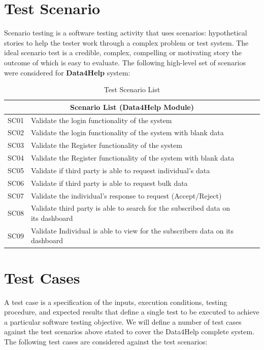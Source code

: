 \documentclass[a4paper, hidelinks, 12pt]{report}
\begin{document}
	\section{Test Scenario}
Scenario testing is a software testing activity that uses scenarios: hypothetical stories to help the tester work through a complex problem or test system. The ideal scenario test is a credible, complex, compelling or motivating story the outcome of which is easy to evaluate. The following high-level set of scenarios were considered for \textbf{Data4Help} system:
\begin{table}[htbp]
  \centering
  \caption{Test Scenario List}
    \begin{tabular}{|l|lrll|}
   \multicolumn{5}{c}{\textbf{Scenario List (Data4Help Module)}} \\
    \midrule
  SC01  & Validate the login functionality of the system &       &       &  \\
   SC02  & Validate the login functionality of the system with blank data &       &       &  \\
   SC03  & Validate the Register functionality of the system &       &       &  \\
   SC04  & Validate the Register functionality of the system with blank data &       &       &  \\
    SC05  & Validate if third party is able to request individual's data  &       &       &  \\
    SC06  & Validate if third party is able to request bulk data  &       &       &  \\
    SC07  & Validate the individual's response to request (Accept/Reject) &       &       &  \\
    SC08  & Validate third party is able to search for the subscribed data on its dashboard &       &       &  \\
    SC09  & Validate Individual is able to view for the subscribers data on its dashboard &       &       &  \\
    \bottomrule
    \end{tabular}%
  \label{tab:Test Scenario List}%
\end{table}%


	\section{Test Cases}
	A  test case is a specification of the inputs, execution conditions, testing procedure, and expected results that define a single test to be executed to achieve a particular software testing objective. We will define a number of test cases against the test scenarios above stated to cover the Data4Help complete system. The following test cases are considered against the test scenarios:
\end{document}
